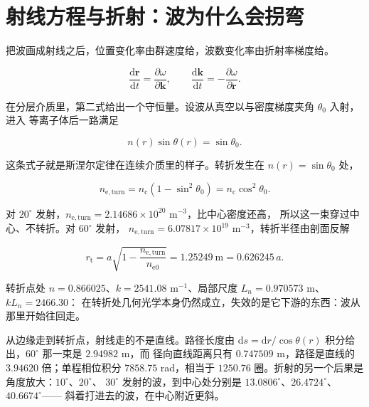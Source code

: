 \section{射线方程与折射：波为什么会拐弯}
\label{sec:app-as-ray}

把波画成射线之后，位置变化率由群速度给，波数变化率由折射率梯度给。

\begin{equation}
\frac{\mathrm{d}\mathbf{r}}{\mathrm{d}t}=\frac{\partial\omega}{\partial\mathbf{k}},
\qquad
\frac{\mathrm{d}\mathbf{k}}{\mathrm{d}t}=-\frac{\partial\omega}{\partial\mathbf{r}} .
\label{eq:app-as-rayeq}
\end{equation}

在分层介质里，第二式给出一个守恒量。设波从真空以与密度梯度夹角 $\theta_0$ 入射，进入
等离子体后一路满足

\begin{equation}
n(r)\sin\theta(r)=\sin\theta_0 .
\label{eq:app-as-snell}
\end{equation}

这条式子就是斯涅尔定律在连续介质里的样子。转折发生在 $n(r)=\sin\theta_0$ 处，

\begin{equation}
n_\mathrm{e,turn}=n_\mathrm{c}\left(1-\sin^2\theta_0\right)
=n_\mathrm{c}\cos^2\theta_0 .
\label{eq:app-as-turning}
\end{equation}

对 $20^\circ$ 发射，$n_\mathrm{e,turn}=2.14686\times10^{20}$ m$^{-3}$，比中心密度还高，
所以这一束穿过中心、不转折。对 $60^\circ$ 发射，
$n_\mathrm{e,turn}=6.07817\times10^{19}$ m$^{-3}$，转折半径由剖面反解

\begin{equation}
r_\mathrm{t}=a\sqrt{1-\frac{n_\mathrm{e,turn}}{n_\mathrm{e0}}}=1.25249\ \mathrm{m}
=0.626245\,a .
\label{eq:app-as-pathturn}
\end{equation}

转折点处 $n=0.866025$、$k=2541.08$ m$^{-1}$、局部尺度 $L_n=0.970573$ m、$kL_n=2466.30$：
在转折处几何光学本身仍然成立，失效的是它下游的东西：波从那里开始往回走。

从边缘走到转折点，射线走的不是直线。路径长度由
$\mathrm{d}s=\mathrm{d}r/\cos\theta(r)$ 积分给出，$60^\circ$ 那一束是 $2.94982$ m，而
径向直线距离只有 $0.747509$ m，路径是直线的 $3.94620$ 倍；单程相位积分
$7858.75$ rad，相当于 $1250.76$ 圈。折射的另一个后果是角度放大：$10^\circ$、$20^\circ$、
$30^\circ$ 发射的波，到中心处分别是 $13.0806^\circ$、$26.4724^\circ$、$40.6674^\circ$——
斜着打进去的波，在中心附近更斜。

